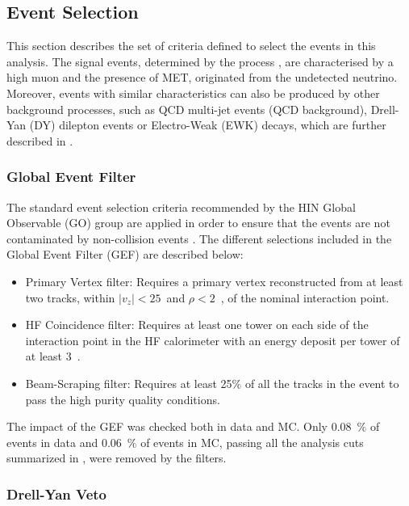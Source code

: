 \subsection{Event Selection} \label{sec:WBoson_Analysis_Selection}


This section describes the set of criteria defined to select the events in this analysis. The signal events, determined by the process \WToMuNu, are characterised by a high \pt muon and the presence of MET, originated from the undetected neutrino. Moreover, events with similar characteristics can also be produced by other background processes, such as QCD multi-jet events (QCD background), Drell-Yan (DY) dilepton events or Electro-Weak (EWK) decays, which are further described in .


\subsubsection{Global Event Filter} \label{sec:WBoson_Analysis_EventFilter}


The \pPb standard event selection criteria recommended by the HIN Global Observable (GO) group are applied in order to ensure that the events are not contaminated by non-collision events \cite{Centrality_pPb}. The different selections included in the \pPb Global Event Filter (GEF) are described below:

\begin{itemize}
\item Primary Vertex filter: Requires a primary vertex reconstructed from at least two tracks, within $\left|v_{z}\right| < 25$~\cm and $\rho < 2$~\cm, of the nominal interaction point.
\item HF Coincidence filter: Requires at least one tower on each side of the interaction point in the HF calorimeter with an energy deposit per tower of at least 3~\GeV.
\item Beam-Scraping filter: Requires at least 25$\%$ of all the tracks in the event to pass the high purity quality conditions.
\end{itemize}

The impact of the GEF was checked both in data and MC. Only 0.08~$\%$ of events in data and 0.06~$\%$ of events in MC, passing all the analysis cuts summarized in , were removed by the filters.

\subsubsection{Drell-Yan Veto} \label{sec:WBoson_Analysis_DrellYanVeto}

